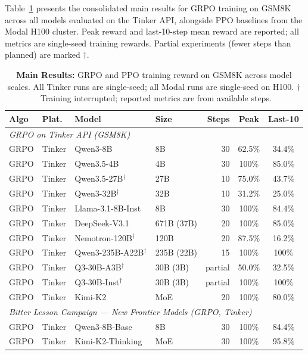 \documentclass{article}
\begin{document}
Table~\ref{tab:main_results} presents the consolidated main results for GRPO
training on GSM8K across all models evaluated on the Tinker API, alongside
PPO baselines from the Modal H100 cluster. Peak reward and last-10-step mean
reward are reported; all metrics are single-seed training rewards.
Partial experiments (fewer steps than planned) are marked $\dagger$.

\begin{table}[t]
\centering
\caption{\textbf{Main Results:} GRPO and PPO training reward on GSM8K across model scales.
All Tinker runs are single-seed; all Modal runs are single-seed on H100.
$\dagger$~Training interrupted; reported metrics are from available steps.}
\label{tab:main_results}
\scriptsize
\setlength{\tabcolsep}{3pt}
\begin{tabular}{@{}l l l l r c c@{}}
\toprule
\textbf{Algo} & \textbf{Plat.} & \textbf{Model} & \textbf{Size} & \textbf{Steps} & \textbf{Peak} & \textbf{Last-10} \\
\midrule
\multicolumn{7}{l}{\textit{GRPO on Tinker API (GSM8K)}} \\
\midrule
GRPO & Tinker & Qwen3-8B & 8B & 30 & 62.5\% & 34.4\% \\
GRPO & Tinker & Qwen3.5-4B & 4B & 30 & 100\% & 85.0\% \\
GRPO & Tinker & Qwen3.5-27B$^\dagger$ & 27B & 10 & 75.0\% & 43.7\% \\
GRPO & Tinker & Qwen3-32B$^\dagger$ & 32B & 10 & 31.2\% & 25.0\% \\
GRPO & Tinker & Llama-3.1-8B-Inst & 8B & 30 & 100\% & 84.4\% \\
GRPO & Tinker & DeepSeek-V3.1 & 671B (37B) & 20 & 100\% & 85.0\% \\
GRPO & Tinker & Nemotron-120B$^\dagger$ & 120B & 20 & 87.5\% & 16.2\% \\
GRPO & Tinker & Qwen3-235B-A22B$^\dagger$ & 235B (22B) & 15 & 100\% & 100\% \\
GRPO & Tinker & Q3-30B-A3B$^\dagger$ & 30B (3B) & partial & 50.0\% & 32.5\% \\
GRPO & Tinker & Q3-30B-Inst$^\dagger$ & 30B (3B) & partial & 100\% & 100\% \\
GRPO & Tinker & Kimi-K2 & MoE & 20 & 100\% & 80.0\% \\
\midrule
\multicolumn{7}{l}{\textit{Bitter Lesson Campaign --- New Frontier Models (GRPO, Tinker)}} \\
\midrule
GRPO & Tinker & Qwen3-8B-Base & 8B & 30 & 100\% & 84.4\% \\
GRPO & Tinker & Kimi-K2-Thinking & MoE & 30 & 100\% & 95.8\% \\

\end{tabular}
\end{table}
\end{document}
